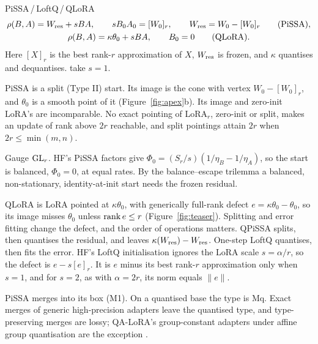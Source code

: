 \begin{example*}{PiSSA\,/\,LoftQ\,/\,QLoRA}\label{ex:pissa}%
\begin{gather*}
  \rho(B,A)=W_{\rm res}+sBA,\qquad sB_0A_0=[W_0]_r,\qquad W_{\rm res}=W_0-[W_0]_r\qquad\text{(PiSSA)},\\
  \rho(B,A)=\kappa\theta_0+sBA,\qquad B_0=0\qquad\text{(QLoRA)}.
\end{gather*}
Here $[X]_r$ is the best rank-$r$ approximation of $X$, $W_{\rm res}$ is frozen, and $\kappa$ quantises and
dequantises. \citet{meng2024pissa} take $s=1$.
\begin{exVIIlines}
\item[Image] PiSSA is a split (Type II) start. Its image is the cone with vertex $W_0-[W_0]_r$, and $\theta_0$ is a
  smooth point of it (Figure~\ref{fig:apex}b). Its image and zero-init LoRA's are incomparable. No exact pointing of
  LoRA$_r$, zero-init or split, makes an update of rank above $2r$ reachable, and split pointings attain $2r$ when
  $2r\le\min(m,n)$.
\item[Fibre] Gauge $\mathrm{GL}_r$. HF's PiSSA factors give $\Phi_0=(S_r/s)(1/\eta_B-1/\eta_A)$, so the start is balanced,
  $\Phi_0=0$, at equal rates. By the balance--escape trilemma a balanced, non-stationary, identity-at-init start needs
  the frozen residual.
\item[Base] QLoRA is LoRA pointed at $\kappa\theta_0$, with generically full-rank defect $e=\kappa\theta_0-\theta_0$,
  so its image misses $\theta_0$ unless $\operatorname{rank} e\le r$ (Figure~\ref{fig:teaser}). Splitting and error fitting change
  the defect, and the order of operations matters. QPiSSA splits, then quantises the residual, and leaves
  $\kappa(W_{\rm res})-W_{\rm res}$. One-step LoftQ quantises, then fits the error. HF's LoftQ initialisation ignores
  the LoRA scale $s=\alpha/r$, so the defect is $e-s[e]_r$. It is $e$ minus its best rank-$r$ approximation only when
  $s=1$, and for $s=2$, as with $\alpha=2r$, its norm equals $\lVert e\rVert$.
\item[Merge] PiSSA merges into its box (M1). On a quantised base the type is Mq. Exact merges of generic
  high-precision adapters leave the quantised type, and type-preserving merges are lossy; QA-LoRA's group-constant
  adapters under affine group quantisation are the exception \citep{xu2023qa}.
\end{exVIIlines}
\end{example*}

